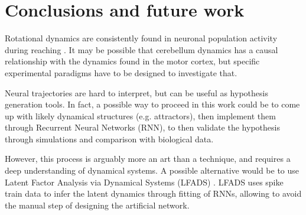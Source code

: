 \section{Conclusions and future work}

Rotational dynamics are consistently found in neuronal population activity during reaching \cite{churchland2012neural}. It may be possible that cerebellum dynamics has a causal relationship with the dynamics found in the motor cortex, but specific experimental paradigms have to be designed to investigate that.

Neural trajectories are hard to interpret, but can be useful as hypothesis generation tools.
In fact, a possible way to proceed in this work could be to come up with likely dynamical structures (e.g. attractors), then implement them through Recurrent Neural Networks (RNN), to then validate the hypothesis through simulations and comparison with biological data.

However, this process is arguably more an art than a technique, and requires a deep understanding of dynamical systems. A possible alternative would be to use Latent Factor Analysis via Dynamical Systems (LFADS) \cite{sussillo2016lfads}.
LFADS uses spike train data to infer the latent dynamics through fitting of RNNs, allowing to avoid the manual step of designing the artificial network.
